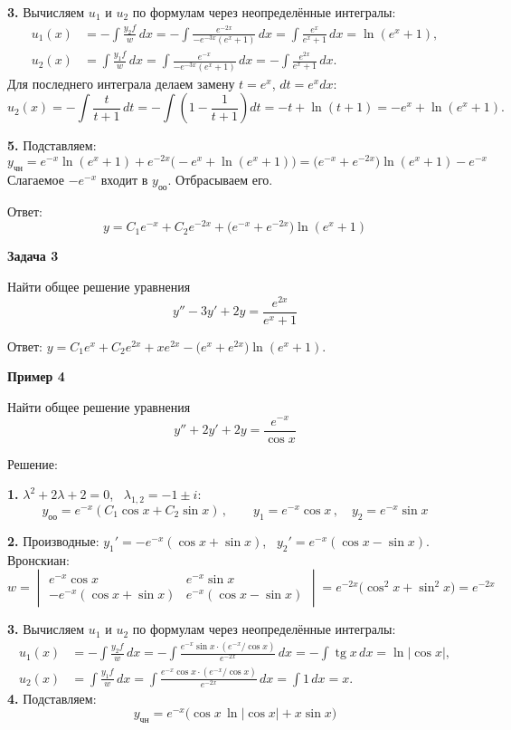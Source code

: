 \documentclass[11pt,a4paper]{article}
\newcommand{\example}[1]{\par\medskip\noindent\textbf{#1}\par\nopagebreak\smallskip}
\newcommand{\yoo}{y_{\text{оо}}}
\newcommand{\ych}{y_{\text{чн}}}
\newcommand{\tgn}{\operatorname{tg}}
\begin{document}
\textbf{3.} Вычисляем $u_1$ и $u_2$ по формулам через неопределённые интегралы:
\[
  \begin{aligned}
    u_1(x) &= -\int\frac{y_2f}{w}\,dx
      = -\int\frac{e^{-2x}}{-e^{-3x}(e^x+1)}\,dx
      = \int\frac{e^x}{e^x+1}\,dx = \ln(e^x+1),\\
    u_2(x) &= \int\frac{y_1f}{w}\,dx
      = \int\frac{e^{-x}}{-e^{-3x}(e^x+1)}\,dx
      = -\int\frac{e^{2x}}{e^x+1}\,dx.
  \end{aligned}
\]
Для последнего интеграла делаем замену $t=e^x$, $dt=e^x dx$:
\[
  u_2(x) = -\int\frac{t}{t+1}\,dt
    = -\int\left(1-\frac{1}{t+1}\right)dt
    = -t+\ln(t+1) = -e^x+\ln(e^x+1).
\]

\textbf{5.} Подставляем:
\[
  \ych = e^{-x}\ln(e^{x} + 1) + e^{-2x}\bigl(-e^{x} + \ln(e^{x} + 1)\bigr) = \bigl(e^{-x} + e^{-2x}\bigr)\ln(e^{x} + 1) - e^{-x}
\]
Слагаемое $-e^{-x}$ входит в $\yoo$. Отбрасываем его.

Ответ:
\[
  y = C_1 e^{-x} + C_2 e^{-2x} + \bigl(e^{-x} + e^{-2x}\bigr)\ln(e^{x} + 1)
\]

\example{Задача 3}

Найти общее решение уравнения
\[
  y'' - 3y' + 2y = \frac{e^{2x}}{e^{x} + 1}
\]

Ответ: $y = C_1 e^{x} + C_2 e^{2x} + x e^{2x} - \bigl(e^{x} + e^{2x}\bigr)\ln(e^{x} + 1)$.


\example{Пример 4}

Найти общее решение уравнения
\[
  y'' + 2y' + 2y = \frac{e^{-x}}{\cos x}
\]

Решение:

\textbf{1.} $\lambda^2 + 2\lambda + 2 = 0$, \ $\lambda_{1,2} = -1 \pm i$:
\[
  \yoo = e^{-x}(C_1\cos x + C_2\sin x)\,, \qquad y_1 = e^{-x}\cos x\,, \quad y_2 = e^{-x}\sin x
\]

\textbf{2.} Производные: $y_1' = -e^{-x}(\cos x + \sin x)$, \ $y_2' = e^{-x}(\cos x - \sin x)$. Вронскиан:
\[
  w = \begin{vmatrix} e^{-x}\cos x & e^{-x}\sin x \\ -e^{-x}(\cos x + \sin x) & e^{-x}(\cos x - \sin x) \end{vmatrix}
  = e^{-2x}\bigl(\cos^2 x + \sin^2 x\bigr) = e^{-2x}
\]

\textbf{3.} Вычисляем $u_1$ и $u_2$ по формулам через неопределённые интегралы:
\[
  \begin{aligned}
    u_1(x) &= -\int\frac{y_2f}{w}\,dx
      = -\int\frac{e^{-x}\sin x\cdot(e^{-x}/\cos x)}{e^{-2x}}\,dx
      = -\int\tgn x\,dx = \ln|\cos x|,\\
    u_2(x) &= \int\frac{y_1f}{w}\,dx
      = \int\frac{e^{-x}\cos x\cdot(e^{-x}/\cos x)}{e^{-2x}}\,dx
      = \int 1\,dx = x.
  \end{aligned}
\]
\textbf{4.} Подставляем:
\[
  \ych = e^{-x}\bigl(\cos x\,\ln|\cos x| + x\sin x\bigr)
\]
\end{document}
